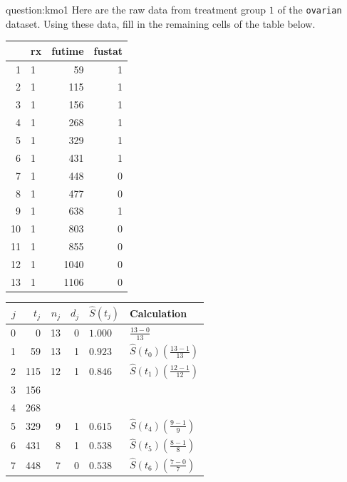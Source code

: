\begin{question}{question:kmo1}
Here are the raw data from treatment group $1$ of the \texttt{ovarian} dataset. Using these data, fill in the remaining cells of the table below.
{\small
\begin{center}
\begin{tabular}{rlrr}
  \toprule
 & rx & futime & fustat \\ 
  \midrule
  1 & 1 & 59 & 1 \\ 
  2 & 1 & 115 & 1 \\ 
  3 & 1 & 156 & 1 \\ 
  4 & 1 & 268 & 1 \\ 
  5 & 1 & 329 & 1 \\ 
  6 & 1 & 431 & 1 \\ 
  7 & 1 & 448 & 0 \\ 
  8 & 1 & 477 & 0 \\ 
  9 & 1 & 638 & 1 \\ 
  10 & 1 & 803 & 0 \\ 
  11 & 1 & 855 & 0 \\ 
  12 & 1 & 1040 & 0 \\ 
  13 & 1 & 1106 & 0 \\ 
  \bottomrule
\end{tabular}
\end{center}
}
\vspace{-5mm}
{\small
\begin{center}
\begin{tabular}{rrrrll}
  \toprule
$j$ & $t_j$ & $n_j$ & $d_j$ & $\hat{S}(t_j)$ & Calculation \\ 
  \midrule
  0 & 0 & 13 & 0 & $1.000$ & $\frac{13-0}{13}$ \\
  1 & 59 & 13 & 1 & $0.923$ & $\hat{S}(t_0) \left(\frac{13-1}{13}\right)$ \\
  2 & 115 & 12 & 1 & $0.846$ & $\hat{S}(t_1) \left(\frac{12-1}{12}\right)$ \\[2mm]
  3 & 156 & \\[2mm] %
  4 & 268 & \\[2mm] %
  5 & 329 & 9 & 1 & $0.615$ & $\hat{S}(t_4) \left(\frac{9-1}{9}\right)$ \\
  6 & 431 & 8 & 1 & $0.538$ & $\hat{S}(t_5) \left(\frac{8-1}{8}\right)$ \\
  7 & 448 & 7 & 0 & $0.538$ & $\hat{S}(t_6) \left(\frac{7-0}{7}\right)$ \\

\end{tabular}
\end{center}}
\end{question}
